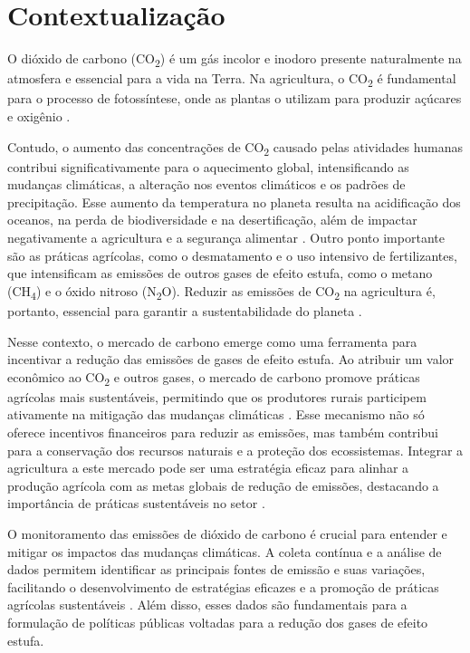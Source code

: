 \section{Contextualização}

O dióxido de carbono (CO\textsubscript{2}) é um gás incolor e inodoro presente naturalmente na atmosfera e essencial para a vida na Terra. Na agricultura, o CO\textsubscript{2} é fundamental para o processo de fotossíntese, onde as plantas o utilizam para produzir açúcares e oxigênio \cite{ipcc2019land}.

Contudo, o aumento das concentrações de CO\textsubscript{2} causado pelas atividades humanas contribui significativamente para o aquecimento global, intensificando as mudanças climáticas, a alteração nos eventos climáticos e os padrões de precipitação. Esse aumento da temperatura no planeta resulta na acidificação dos oceanos, na perda de biodiversidade e na desertificação, além de impactar negativamente a agricultura e a segurança alimentar \cite{ipcc2021ar6}. Outro ponto importante são as práticas agrícolas, como o desmatamento e o uso intensivo de fertilizantes, que intensificam as emissões de outros gases de efeito estufa, como o metano (CH\textsubscript{4}) e o óxido nitroso (N\textsubscript{2}O). Reduzir as emissões de CO\textsubscript{2} na agricultura é, portanto, essencial para garantir a sustentabilidade do planeta \cite{ipcc2014afolu}.

Nesse contexto, o mercado de carbono emerge como uma ferramenta para incentivar a redução das emissões de gases de efeito estufa. Ao atribuir um valor econômico ao CO\textsubscript{2} e outros gases, o mercado de carbono promove práticas agrícolas mais sustentáveis, permitindo que os produtores rurais participem ativamente na mitigação das mudanças climáticas \cite{worldbank2022carbon}. Esse mecanismo não só oferece incentivos financeiros para reduzir as emissões, mas também contribui para a conservação dos recursos naturais e a proteção dos ecossistemas. Integrar a agricultura a este mercado pode ser uma estratégia eficaz para alinhar a produção agrícola com as metas globais de redução de emissões, destacando a importância de práticas sustentáveis no setor \cite{unfccc2020markets}.

O monitoramento das emissões de dióxido de carbono é crucial para entender e mitigar os impactos das mudanças climáticas. A coleta contínua e a análise de dados permitem identificar as principais fontes de emissão e suas variações, facilitando o desenvolvimento de estratégias eficazes e a promoção de práticas agrícolas sustentáveis \cite{ipcc2014afolu}. Além disso, esses dados são fundamentais para a formulação de políticas públicas voltadas para a redução dos gases de efeito estufa.

